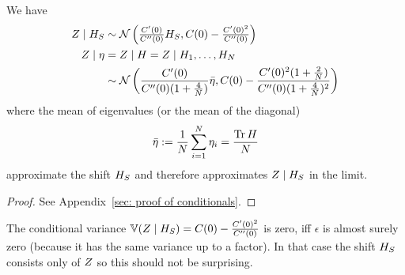 \begin{theorem}
	\label{thm: conditional distributions of rf}
	We have
	\begin{align}
		Z\mid H_S
		&\sim \mathcal{N}\left(
			\tfrac{C'(0)}{C''(0)} H_S,
			C(0) - \tfrac{C'(0)^2}{C''(0)}
		\right)\\
		Z\mid \eta
		&=Z\mid H = Z \mid H_1,\dots, H_N
		\nonumber\\
		&\sim \mathcal{N}\left(
		\frac{C'(0)}{C''(0)(1+\tfrac4{N})}\bar{\eta},
		C(0)-\frac{C'(0)^2(1+\tfrac2{N})}{C''(0)(1+\tfrac4{N})^2}
	\right)
	\end{align}
	where the mean of eigenvalues (or the mean of the diagonal)
	\[
		\bar{\eta}
		:=\frac1{N}\sum_{i=1}^N \eta_i
		=\frac{\operatorname{Tr}{H}}{N}
	\]
	approximate the shift \(H_S\) and therefore approximates \(Z\mid H_S\) in
	the limit.
\end{theorem}
\begin{proof}
	See Appendix~\ref{sec: proof of conditionals}.
\end{proof}
\begin{remark}
	The conditional variance \(\mathbb{V}(Z\mid H_S)= C(0) -
	\tfrac{C'(0)^2}{C''(0)}\) is zero, iff \(\epsilon\) is almost surely
	zero (because it has the same variance up to a factor). In that case the
	shift \(H_S\) consists only of \(Z\) so this should not be surprising.
\end{remark}


